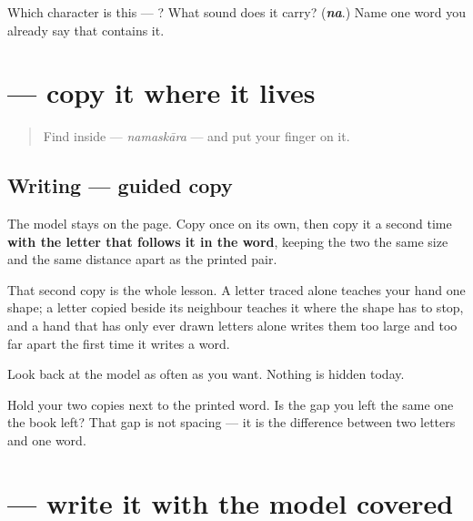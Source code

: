 \begin{tcolorbox}[breakable,colback=teal!4,colframe=teal!35!black,title={Before you move on}]
Which character is this — ? What sound does it carry? (\emph{\textbf{na}}.) Name one word you already say that contains it.
\end{tcolorbox}
\section[\texorpdfstring{\kn{ನ} (na)}{ನ (na)}]{ — copy it where it lives}

\label{lesson:KA-S01-copy-in-a-word}



\begin{quote}
Find \textbf{} inside \textbf{} — \emph{namaskāra} — and put your finger on it.
\end{quote}

\subsection*{Writing — guided copy}

The model stays on the page. Copy \textbf{} once on its own, then copy it a second time \textbf{with the letter that follows it in the word}, keeping the two the same size and the same distance apart as the printed pair.

That second copy is the whole lesson. A letter traced alone teaches your hand one shape; a letter copied beside its neighbour teaches it where the shape has to stop, and a hand that has only ever drawn letters alone writes them too large and too far apart the first time it writes a word.

Look back at the model as often as you want. Nothing is hidden today.

\begin{tcolorbox}[breakable,colback=teal!4,colframe=teal!35!black,title={Before you move on}]
Hold your two copies next to the printed word. Is the gap you left the same one the book left? That gap is not spacing — it is the difference between two letters and one word.
\end{tcolorbox}
\section[\texorpdfstring{\kn{ನ} (na)}{ನ (na)}]{ — write it with the model covered}

